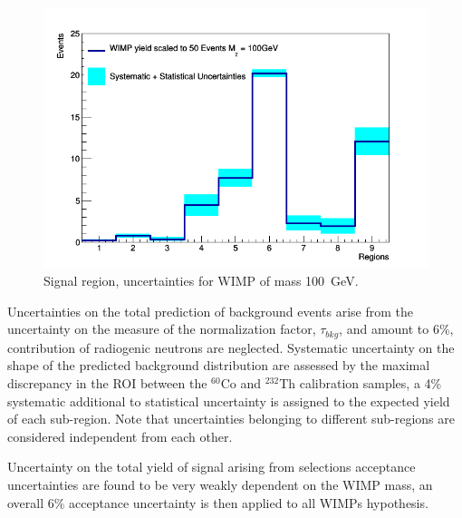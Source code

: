 \begin{figure}[t!]
  \includegraphics[width=\linewidth]{images/wimp_sys_unc.png}
  \caption{Signal region, uncertainties for WIMP of mass 100~GeV.}
  \label{fig:unc}
\end{figure}


Uncertainties on the total prediction of background events arise from the uncertainty on the measure of the normalization 
factor, $\tau_{bkg}$, and amount to 6\%, contribution of radiogenic neutrons are neglected. 
Systematic uncertainty on the shape of the predicted background distribution are assessed by the maximal discrepancy in the ROI between
the $^{60}$Co and $^{232}$Th calibration samples, a 4\% systematic additional to statistical uncertainty is assigned to the expected yield of each sub-region.
Note that uncertainties belonging to different sub-regions are considered independent from each other.

Uncertainty on the total yield of signal arising from selections acceptance uncertainties are found to be very weakly dependent on 
the WIMP mass, an overall 6\% acceptance uncertainty is then applied to all WIMPs hypothesis. 

